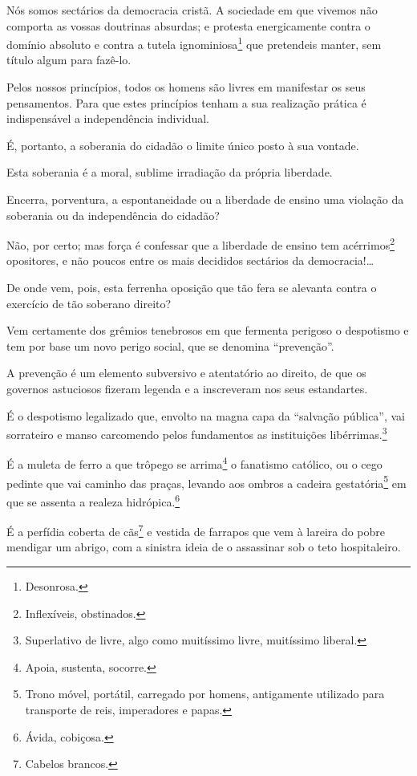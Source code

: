Nós somos sectários da democracia cristã. A sociedade em que vivemos não
comporta as vossas doutrinas absurdas; e protesta energicamente contra o
domínio absoluto e contra a tutela ignominiosa\footnote{Desonrosa.}
que pretendeis manter, sem título algum para fazê-lo.

Pelos nossos princípios, todos os homens são livres em manifestar os
seus pensamentos. Para que estes princípios tenham a sua realização
prática é indispensável a independência individual.

É, portanto, a soberania do cidadão o limite único posto à sua vontade.

Esta soberania é a moral, sublime irradiação da própria liberdade.

Encerra, porventura, a espontaneidade ou a liberdade de ensino uma
violação da soberania ou da independência do cidadão?

Não, por certo; mas força é confessar que a liberdade de ensino tem
acérrimos\footnote{Inflexíveis, obstinados.} opositores, e não poucos
entre os mais decididos sectários da democracia!\ldots{}

De onde vem, pois, esta ferrenha oposição que tão fera se alevanta
contra o exercício de tão soberano direito?

Vem certamente dos grêmios tenebrosos em que fermenta perigoso o
despotismo e tem por base um novo perigo social, que se denomina
``prevenção''.

A prevenção é um elemento subversivo e atentatório ao direito, de que os
governos astuciosos fizeram legenda e a inscreveram nos seus
estandartes.

É o despotismo legalizado que, envolto na magna capa da ``salvação
pública'', vai sorrateiro e manso carcomendo pelos fundamentos as
instituições libérrimas.\footnote{Superlativo de livre, algo como
  muitíssimo livre, muitíssimo liberal.}

É a muleta de ferro a que trôpego se arrima\footnote{Apoia, sustenta,
  socorre.} o fanatismo católico, ou o cego pedinte que vai caminho das %
praças, levando aos ombros a cadeira gestatória\footnote{Trono móvel,
  portátil, carregado por homens, antigamente utilizado para transporte
  de reis, imperadores e papas.} em que se assenta a realeza
hidrópica.\footnote{Ávida, cobiçosa.}

É a perfídia coberta de cãs\footnote{Cabelos brancos.} e vestida de
farrapos que vem à lareira do pobre mendigar um abrigo, com a sinistra
ideia de o assassinar sob o teto hospitaleiro.

